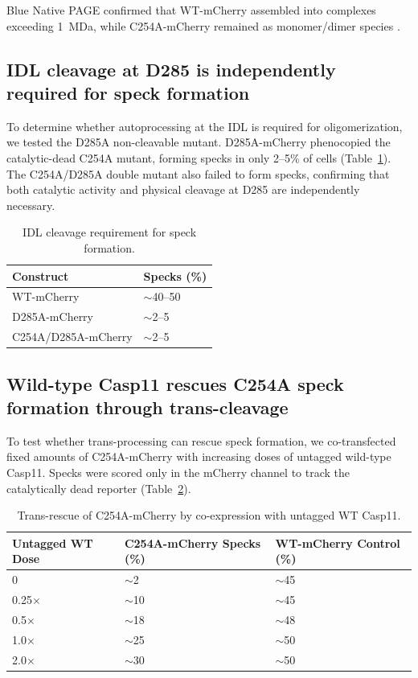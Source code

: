\documentclass[11pt,a4paper]{article}
\begin{document}
Blue Native PAGE confirmed that WT-mCherry assembled into complexes exceeding 1~MDa, while C254A-mCherry remained as monomer/dimer species \citep{Boucher2018}.

\subsection{IDL cleavage at D285 is independently required for speck formation}

To determine whether autoprocessing at the IDL is required for oligomerization, we tested the D285A non-cleavable mutant. D285A-mCherry phenocopied the catalytic-dead C254A mutant, forming specks in only 2--5\% of cells (Table~\ref{tab:d285a}). The C254A/D285A double mutant also failed to form specks, confirming that both catalytic activity and physical cleavage at D285 are independently necessary.

\begin{table}[htbp]
\centering
\caption{IDL cleavage requirement for speck formation.}
\label{tab:d285a}
\begin{tabular}{ll}
\toprule
\textbf{Construct} & \textbf{Specks (\%)} \\
\midrule
WT-mCherry & $\sim$40--50 \\
D285A-mCherry & $\sim$2--5 \\
C254A/D285A-mCherry & $\sim$2--5 \\
\bottomrule
\end{tabular}
\end{table}

\subsection{Wild-type Casp11 rescues C254A speck formation through trans-cleavage}

To test whether trans-processing can rescue speck formation, we co-transfected fixed amounts of C254A-mCherry with increasing doses of untagged wild-type Casp11. Specks were scored only in the mCherry channel to track the catalytically dead reporter (Table~\ref{tab:trans_rescue}).

\begin{table}[htbp]
\centering
\caption{Trans-rescue of C254A-mCherry by co-expression with untagged WT Casp11.}
\label{tab:trans_rescue}
\begin{tabular}{lll}
\toprule
\textbf{Untagged WT Dose} & \textbf{C254A-mCherry Specks (\%)} & \textbf{WT-mCherry Control (\%)} \\
\midrule
0 & $\sim$2 & $\sim$45 \\
0.25$\times$ & $\sim$10 & $\sim$45 \\
0.5$\times$ & $\sim$18 & $\sim$48 \\
1.0$\times$ & $\sim$25 & $\sim$50 \\
2.0$\times$ & $\sim$30 & $\sim$50 \\
\bottomrule
\end{tabular}
\end{table}
\end{document}
